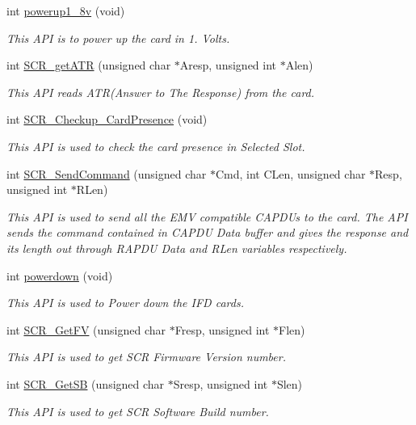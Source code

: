 \begin{DoxyCompactItemize}
int \hyperlink{group__E_gabc346300f471a35d0502373f5b04766e}{powerup1\+\_\+8v} (void)
\begin{DoxyCompactList}\small\item\em This A\+P\+I is to power up the card in 1. Volts. \end{DoxyCompactList}\item 
int \hyperlink{group__E_gaff820a31b976fcb517d872d74c7cd88c}{S\+C\+R\+\_\+get\+A\+T\+R} (unsigned char $\ast$Aresp, unsigned int $\ast$Alen)
\begin{DoxyCompactList}\small\item\em This A\+P\+I reads A\+T\+R(\+Answer to The Response) from the card. \end{DoxyCompactList}\item 
int \hyperlink{group__E_ga93fed44584244baac49478d101448441}{S\+C\+R\+\_\+\+Checkup\+\_\+\+Card\+Presence} (void)
\begin{DoxyCompactList}\small\item\em This A\+P\+I is used to check the card presence in Selected Slot. \end{DoxyCompactList}\item 
int \hyperlink{group__E_gafe7a146be5453ea14e7c41ea41d2dc33}{S\+C\+R\+\_\+\+Send\+Command} (unsigned char $\ast$Cmd, int C\+Len, unsigned char $\ast$Resp, unsigned int $\ast$R\+Len)
\begin{DoxyCompactList}\small\item\em This A\+P\+I is used to send all the E\+M\+V compatible C\+A\+P\+D\+Us to the card. The A\+P\+I sends the command contained in C\+A\+P\+D\+U Data buffer and gives the response and its length out through R\+A\+P\+D\+U Data and R\+Len variables respectively. \end{DoxyCompactList}\item 
int \hyperlink{group__E_ga0ba852a4be481d685f594b18529c2d6b}{powerdown} (void)
\begin{DoxyCompactList}\small\item\em This A\+P\+I is used to Power down the I\+F\+D cards. \end{DoxyCompactList}\item 
int \hyperlink{group__E_gac6a5cb156099b15c7e569b5ba6dbfe5c}{S\+C\+R\+\_\+\+Get\+F\+V} (unsigned char $\ast$Fresp, unsigned int $\ast$Flen)
\begin{DoxyCompactList}\small\item\em This A\+P\+I is used to get S\+C\+R Firmware Version number. \end{DoxyCompactList}\item 
int \hyperlink{group__E_gae44d3efab59f709e4134c3e2c6d0bd95}{S\+C\+R\+\_\+\+Get\+S\+B} (unsigned char $\ast$Sresp, unsigned int $\ast$Slen)
\begin{DoxyCompactList}\small\item\em This A\+P\+I is used to get S\+C\+R Software Build number. \end{DoxyCompactList}\end{DoxyCompactItemize}


